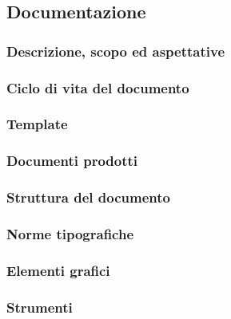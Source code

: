 \subsection{Documentazione}

\subsubsection{Descrizione, scopo ed aspettative}

\subsubsection{Ciclo di vita del documento}

\subsubsection{Template}

\subsubsection{Documenti prodotti}



\subsubsection{Struttura del documento}






\subsubsection{Norme tipografiche}





\subsubsection{Elementi grafici}



\subsubsection{Strumenti}



